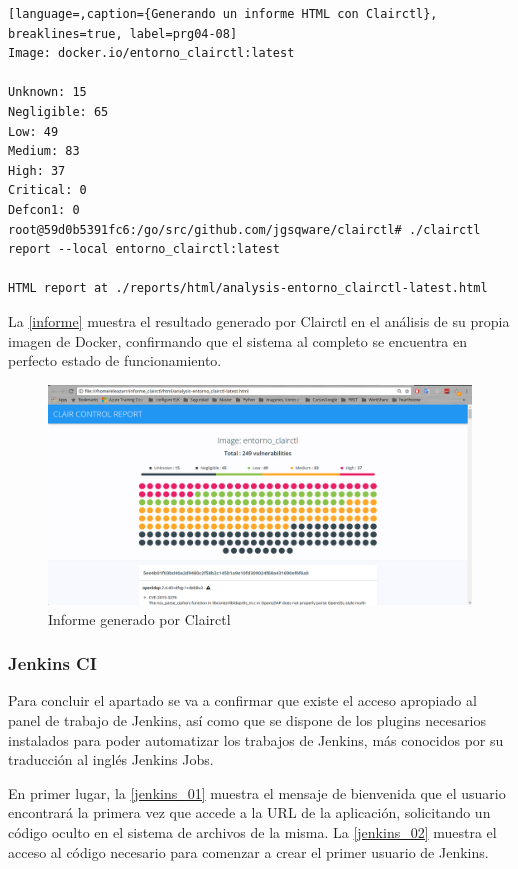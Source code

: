 \begin{lstlisting}[language=,caption={Generando un informe HTML con Clairctl}, breaklines=true, label=prg04-08]
Image: docker.io/entorno_clairctl:latest

Unknown: 15
Negligible: 65
Low: 49
Medium: 83
High: 37
Critical: 0
Defcon1: 0
root@59d0b5391fc6:/go/src/github.com/jgsqware/clairctl# ./clairctl report --local entorno_clairctl:latest                  

HTML report at ./reports/html/analysis-entorno_clairctl-latest.html
\end{lstlisting}

La \autoref{informe} muestra el resultado generado por Clairctl en el análisis de su propia imagen de Docker, confirmando que el sistema al completo se encuentra en perfecto estado de funcionamiento.

\begin{figure}[htbp]
	\centering
	\includegraphics[width=1.0\linewidth]
	{desarrollo/figuras/informe_clairctl.png}
	\caption{Informe generado por Clairctl}
	\label{informe}
\end{figure}

\subsubsection{Jenkins CI}

Para concluir el apartado se va a confirmar que existe el acceso apropiado al panel de trabajo de Jenkins, así como que se dispone de los plugins necesarios instalados para poder automatizar los trabajos de Jenkins, más conocidos por su traducción al inglés Jenkins Jobs.

En primer lugar, la \autoref{jenkins_01} muestra el mensaje de bienvenida que el usuario encontrará la primera vez que accede a la URL de la aplicación, solicitando un código oculto en el sistema de archivos de la misma. La \autoref{jenkins_02} muestra el acceso al código necesario para comenzar a crear el primer usuario de Jenkins.



